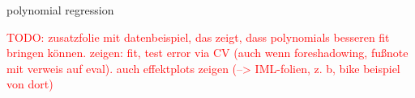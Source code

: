 \documentclass[11pt,compress,t,notes=noshow, xcolor=table]{beamer}
\begin{document}

\begin{frame}{polynomial regression}

\textcolor{red}{TODO: zusatzfolie mit datenbeispiel, das zeigt, dass polynomials 
besseren fit bringen können. zeigen: fit, test error via CV (auch wenn 
foreshadowing, fußnote mit verweis auf eval). auch effektplots zeigen 
(--> IML-folien, z. b, bike beispiel von dort)}

\end{frame}


\endlecture
\end{document}
